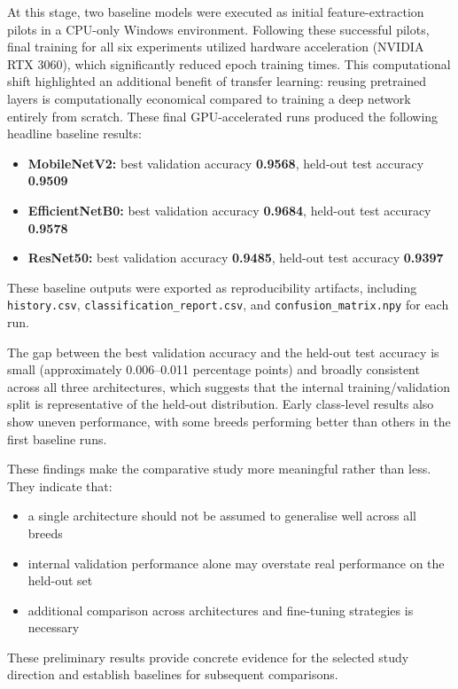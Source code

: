 \documentclass[12pt, a4paper]{article}
\begin{document}
At this stage, two baseline models were executed as initial feature-extraction pilots in a CPU-only Windows environment. Following these successful pilots, final training for all six experiments utilized hardware acceleration (NVIDIA RTX 3060), which significantly reduced epoch training times. This computational shift highlighted an additional benefit of transfer learning: reusing pretrained layers is computationally economical compared to training a deep network entirely from scratch. These final GPU-accelerated runs produced the following headline baseline results:

\begin{itemize}
  \item \textbf{MobileNetV2:} best validation accuracy \textbf{0.9568}, held-out test accuracy \textbf{0.9509}
  \item \textbf{EfficientNetB0:} best validation accuracy \textbf{0.9684}, held-out test accuracy \textbf{0.9578}
  \item \textbf{ResNet50:} best validation accuracy \textbf{0.9485}, held-out test accuracy \textbf{0.9397}
\end{itemize}

These baseline outputs were exported as reproducibility artifacts, including \texttt{history.csv}, \texttt{classification\_report.csv}, and \texttt{confusion\_matrix.npy} for each run.

The gap between the best validation accuracy and the held-out test accuracy is small (approximately 0.006--0.011 percentage points) and broadly consistent across all three architectures, which suggests that the internal training/validation split is representative of the held-out distribution. Early class-level results also show uneven performance, with some breeds performing better than others in the first baseline runs.

These findings make the comparative study more meaningful rather than less. They indicate that:

\begin{itemize}
  \item a single architecture should not be assumed to generalise well across all breeds
  \item internal validation performance alone may overstate real performance on the held-out set
  \item additional comparison across architectures and fine-tuning strategies is necessary
\end{itemize}

These preliminary results provide concrete evidence for the selected study direction and establish baselines for subsequent comparisons.
\end{document}
